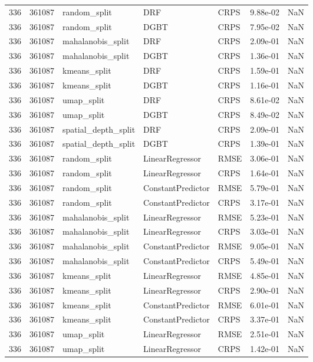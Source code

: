 \begin{tabular}{rrlllrr}
336 & 361087 & random\_split & DRF & CRPS & 9.88e-02 & NaN \\
336 & 361087 & random\_split & DGBT & CRPS & 7.95e-02 & NaN \\
336 & 361087 & mahalanobis\_split & DRF & CRPS & 2.09e-01 & NaN \\
336 & 361087 & mahalanobis\_split & DGBT & CRPS & 1.36e-01 & NaN \\
336 & 361087 & kmeans\_split & DRF & CRPS & 1.59e-01 & NaN \\
336 & 361087 & kmeans\_split & DGBT & CRPS & 1.16e-01 & NaN \\
336 & 361087 & umap\_split & DRF & CRPS & 8.61e-02 & NaN \\
336 & 361087 & umap\_split & DGBT & CRPS & 8.49e-02 & NaN \\
336 & 361087 & spatial\_depth\_split & DRF & CRPS & 2.09e-01 & NaN \\
336 & 361087 & spatial\_depth\_split & DGBT & CRPS & 1.39e-01 & NaN \\
336 & 361087 & random\_split & LinearRegressor & RMSE & 3.06e-01 & NaN \\
336 & 361087 & random\_split & LinearRegressor & CRPS & 1.64e-01 & NaN \\
336 & 361087 & random\_split & ConstantPredictor & RMSE & 5.79e-01 & NaN \\
336 & 361087 & random\_split & ConstantPredictor & CRPS & 3.17e-01 & NaN \\
336 & 361087 & mahalanobis\_split & LinearRegressor & RMSE & 5.23e-01 & NaN \\
336 & 361087 & mahalanobis\_split & LinearRegressor & CRPS & 3.03e-01 & NaN \\
336 & 361087 & mahalanobis\_split & ConstantPredictor & RMSE & 9.05e-01 & NaN \\
336 & 361087 & mahalanobis\_split & ConstantPredictor & CRPS & 5.49e-01 & NaN \\
336 & 361087 & kmeans\_split & LinearRegressor & RMSE & 4.85e-01 & NaN \\
336 & 361087 & kmeans\_split & LinearRegressor & CRPS & 2.90e-01 & NaN \\
336 & 361087 & kmeans\_split & ConstantPredictor & RMSE & 6.01e-01 & NaN \\
336 & 361087 & kmeans\_split & ConstantPredictor & CRPS & 3.37e-01 & NaN \\
336 & 361087 & umap\_split & LinearRegressor & RMSE & 2.51e-01 & NaN \\
336 & 361087 & umap\_split & LinearRegressor & CRPS & 1.42e-01 & NaN \\

\end{tabular}
